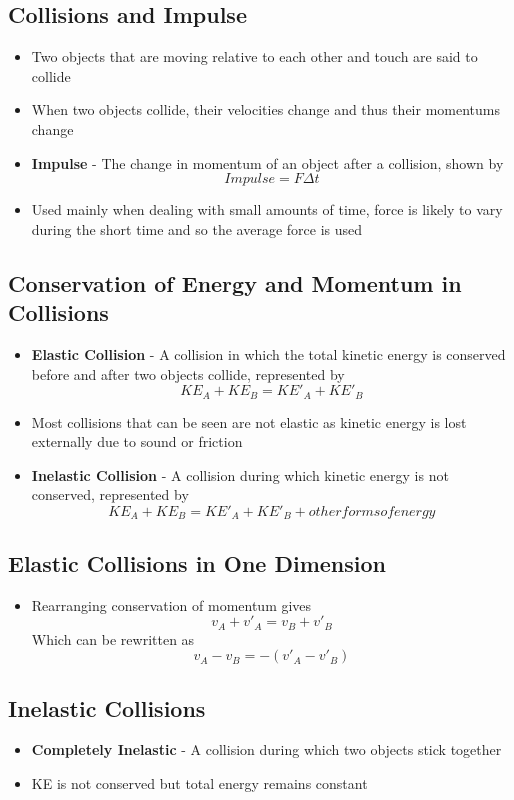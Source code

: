\subsection{Collisions and Impulse}
\begin{itemize}
    \item Two objects that are moving relative to each other and touch are said to collide
    \item When two objects collide, their velocities change and thus their momentums change
    \item \textbf{Impulse} - The change in momentum of an object after a collision, shown by \[Impulse=F\Delta t\]
    \item Used mainly when dealing with small amounts of time, force is likely to vary during the short time and so the average force is used
\end{itemize}

\subsection{Conservation of Energy and Momentum in Collisions}
\begin{itemize}
    \item \textbf{Elastic Collision} - A collision in which the total kinetic energy is conserved before and after two objects collide, represented by \[KE_A+KE_B=KE'_A+KE'_B\]
    \item Most collisions that can be seen are not elastic as kinetic energy is lost externally due to sound or friction
    \item \textbf{Inelastic Collision} - A collision during which kinetic energy is not conserved, represented by \[KE_A+KE_B=KE'_A+KE'_B+other forms of energy\]
\end{itemize}

\subsection{Elastic Collisions in One Dimension}
\begin{itemize}
    \item Rearranging conservation of momentum gives \[v_A+v'_A=v_B+v'_B\] Which can be rewritten as \[v_A-v_B=-(v'_A-v'_B)\]
\end{itemize}

\subsection{Inelastic Collisions}
\begin{itemize}
    \item \textbf{Completely Inelastic} - A collision during which two objects stick together
    \item KE is not conserved but total energy remains constant
\end{itemize}

